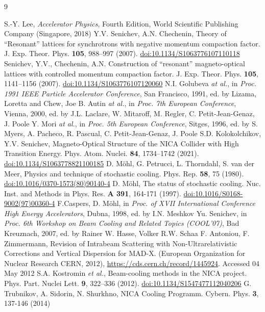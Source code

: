 \documentclass[a4paper,
               keeplastbox,   %
               ]{jacow}
\begin{document}
	{\printbibliography}
	{
	\begin{thebibliography}{9}
	
	 S.-Y. Lee, {\it Accelerator Physics}, Fourth Edition, World Scientific Publishing Company (Singapore, 2018)
	 Y.V. Senichev, A.N. Chechenin, Theory of “Resonant” lattices for synchrotrons with negative momentum compaction factor. J. Exp. Theor. Phys. {\bf 105}, 988–997 (2007). \url{doi:10.1134/S1063776107110118}
	 Senichev, Y.V., Chechenin, A.N. Construction of “resonant” magneto-optical lattices with controlled momentum compaction factor. J. Exp. Theor. Phys. {\bf 105}, 1141–1156 (2007). \url{doi:10.1134/S1063776107120060}
	 N.I. Golubeva \emph{at al.}, in {\it Proc. 1991 IEEE Particle Accelerator Conference}, San Francisco, 1991, ed. by Lizama, Loretta and Chew, Joe
	 B. Autin \emph{at al.}, in {\it Proc. 7th European Conference},  Vienna, 2000, ed. by J.L. Laclare, W. Mitaroff, M. Regler, C. Petit-Jean-Genaz, J. Poole
		Y. Mori \emph{at al.}, in {\it Proc. 5th European Conference}, Sitges, 1996, ed. by S. Myers, A. Pacheco, R. Pascual, C. Petit-Jean-Genaz, J. Poole
	 S.D. Kolokolchikov, Y.V. Senichev, Magneto-Optical Structure of the NICA Collider with High Transition Energy. Phys. Atom. Nuclei. {\bf 84}, 1734–1742 (2021). \url{doi:10.1134/S1063778821100185}
	 D. Möhl, G. Petrucci, L. Thorndahl, S. van der Meer, Physics and technique of stochastic cooling. Phys. Rep. {\bf 58}, 75 (1980). \url{doi:10.1016/0370-1573(80)90140-4}
	 D. Möhl, The status of stochastic cooling. Nuc. Inst. and Methods in Phys. Res. {\bf A 391}, 164-171 (1997). \url{doi:10.1016/S0168-9002(97)00360-4}
	 F.Caspers, D. Möhl, in {\it Proc. of XVII International Conference High Energy Accelerators}, Dubna, 1998, ed. by I.N. Meshkov
	 Yu. Senichev, in {\it Proc. 6th Workshop on Beam Cooling and Related Topics (COOL'07)}, Bad Kreuznach, 2007, ed. by Rainer W. Hasse, Volker R.W. Schaa
	 F. Antoniou, F. Zimmermann, Revision of Intrabeam Scattering with Non-Ultrarelativistic Corrections and Vertical Dispersion for MAD-X. (European Organization for Nuclear Research CERN, 2012), \url{https://cds.cern.ch/record/1445924}. Accessed 04 May 2012
	 S.A. Kostromin \emph{et al.}, Beam-cooling methods in the NICA project. Phys. Part. Nuclei Lett. {\bf 9}, 322–336 (2012). \url{doi:10.1134/S1547477112040206}
	 G. Trubnikov, A. Sidorin, N. Shurkhno, NICA Cooling Programm. Cybern. Phys. {\bf 3}, 137-146 (2014)
	
	\end{thebibliography}
}
\end{document}
